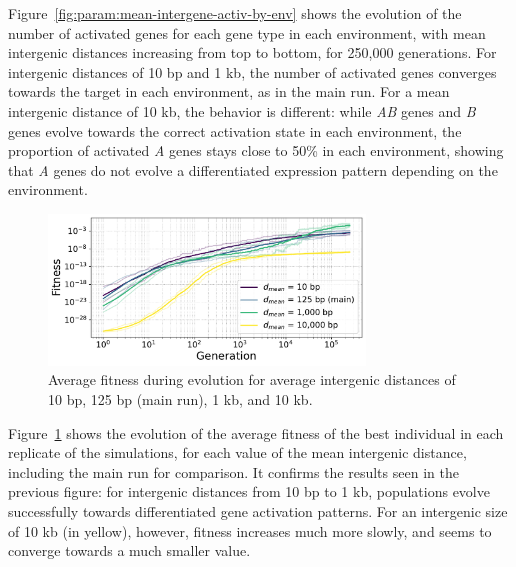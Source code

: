 Figure~\ref{fig:param:mean-intergene-activ-by-env} shows the evolution of the number of activated genes for each gene type in each environment, with mean intergenic distances increasing from top to bottom, for 250,000 generations.
For intergenic distances of 10 bp and 1 kb, the number of activated genes converges towards the target in each environment, as in the main run.
For a mean intergenic distance of 10 kb, the behavior is different: while \emph{AB} genes and \emph{B} genes evolve towards the correct activation state in each environment, the proportion of activated \emph{A} genes stays close to 50\% in each environment, showing that \emph{A} genes do not evolve a differentiated expression pattern depending on the environment.

\begin{figure}
\centering
\includegraphics[width=0.75\textwidth]{param/mean-intergene/fitness_all_with_main.pdf}
\caption[Average fitness during evolution, with increasing mean intergenic distances]{Average fitness during evolution for average intergenic distances of 10 bp, 125 bp (main run), 1 kb, and 10 kb.}
\label{fig:param:mean-intergene-fitness}
\end{figure}

Figure~\ref{fig:param:mean-intergene-fitness} shows the evolution of the average fitness of the best individual in each replicate of the simulations, for each value of the mean intergenic distance, including the main run for comparison.
It confirms the results seen in the previous figure: for intergenic distances from 10 bp to 1 kb, populations evolve successfully towards differentiated gene activation patterns.
For an intergenic size of 10 kb (in yellow), however, fitness increases much more slowly, and seems to converge towards a much smaller value.

